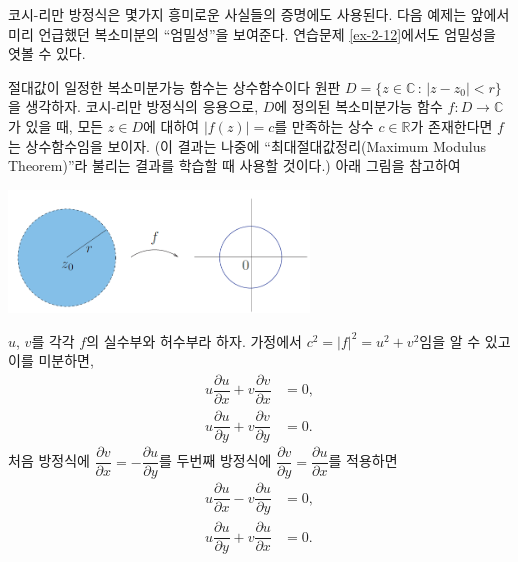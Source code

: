 코시-리만 방정식은 몇가지 흥미로운 사실들의 증명에도 사용된다.
다음 예제는 앞에서 미리 언급했던 복소미분의 ``엄밀성''을 보여준다.
연습문제 \ref{ex-2-12}에서도 엄밀성을 엿볼 수 있다.


\begin{saltexample}[label=example-2-11]{절대값이 일정한 복소미분가능 함수는 상수함수이다}{}
원판 $D=\{ z\in\mathbb C \,:\, |z-z_0| <r \}$을 생각하자.
코시-리만 방정식의 응용으로, $D$에 정의된 복소미분가능 함수 $f: D \to \mathbb C$가 있을 때,
모든 $z\in D$에 대하여 $|f(z)| =c$를 만족하는 상수 $c\in\mathbb R$가 
존재한다면 $f$는 상수함수임을 보이자.
(이 결과는 나중에 ``최대절대값정리(Maximum Modulus Theorem)''라 불리는 결과를
학습할 때 사용할 것이다.)
아래 그림을 참고하여

\begin{center}
\includegraphics[width=0.6\textwidth]{./SaltChapter/figs/fig-2-0-2}
\end{center}

$u$, $v$를 각각 $f$의 실수부와 허수부라 하자. 
가정에서 $c^2=|f|^2 = u^2 + v^2$임을 알 수 있고 이를 미분하면,
\begin{align*}
u\dfrac{\partial u}{\partial x} + v\dfrac{\partial v}{\partial x} &= 0, \\
u\dfrac{\partial u}{\partial y} + v\dfrac{\partial v}{\partial y} &= 0.
\end{align*}
처음 방정식에 $\dfrac{\partial v}{\partial x} = - \dfrac{\partial u}{\partial y}$를
두번째 방정식에 $\dfrac{\partial v}{\partial y} = \dfrac{\partial u}{\partial x}$를
적용하면
\begin{eqnarray}
u\dfrac{\partial u}{\partial x} - v\dfrac{\partial u}{\partial y} &= 0, \label{eq-2-8}\\
u\dfrac{\partial u}{\partial y} + v\dfrac{\partial u}{\partial x} &= 0. \label{eq-2-9}
\end{eqnarray}


\end{saltexample}
